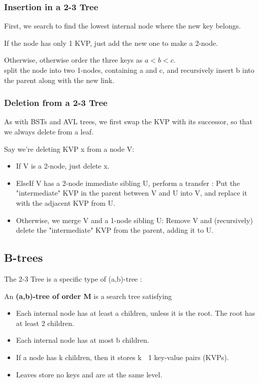 \documentclass{article}
\begin{document}
\subsubsection*{Insertion in a 2-3 Tree}
First, we search to find the lowest internal node where the new key
belongs.



If the node has only 1 KVP, just add the new one to make a 2-node.



Otherwise, otherwise order the three keys as \(a < b < c\). \\
split the node into two 1-nodes, containing a and c, and recursively insert b into the parent along with the new link.  

\subsubsection*{Deletion from a 2-3 Tree}
As with BSTs and AVL trees, we first swap the KVP with its successor,
so that we always delete from a leaf.


Say we're deleting KVP x from a node V:
\begin{itemize}
\item If V is a 2-node, just delete x.
\item ElseIf V has a 2-node immediate sibling U, perform a transfer :
Put the "intermediate" KVP in the parent between V and U into V,
and replace it with the adjacent KVP from U.
\item Otherwise, we merge V and a 1-node sibling U:
Remove V and (recursively) delete the "intermediate" KVP
from the parent, adding it to U.
\end{itemize}


\subsection*{B-trees}
The 2-3 Tree is a specific type of (a,b)-tree :

An \textbf{(a,b)-tree of order M} is a search tree satisfying 
\begin{itemize}
\item Each internal node has at least a children, unless it is the root.
The root has at least 2 children.
\item Each internal node has at most b children.
\item If a node has k children, then it stores k 􀀀 1 key-value pairs (KVPs).
\item Leaves store no keys and are at the same level.
\end{itemize}
\end{document}
